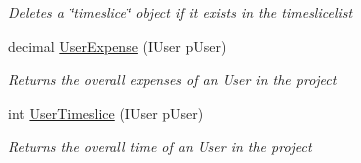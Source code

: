 \begin{DoxyCompactItemize}
\begin{DoxyCompactList}\small\item\em Deletes a \char`\"{}timeslice\char`\"{} object if it exists in the timeslicelist \end{DoxyCompactList}\item 
decimal \hyperlink{class_plex_byte_1_1_mo_cap_1_1_interactions_1_1_account_a44cddcf32dbd3ce31fc012104f25e9f8}{User\+Expense} (I\+User p\+User)
\begin{DoxyCompactList}\small\item\em Returns the overall expenses of an User in the project \end{DoxyCompactList}\item 
int \hyperlink{class_plex_byte_1_1_mo_cap_1_1_interactions_1_1_account_a77706a7728657fb56f5f5dc85bd738f4}{User\+Timeslice} (I\+User p\+User)
\begin{DoxyCompactList}\small\item\em Returns the overall time of an User in the project \end{DoxyCompactList}\end{DoxyCompactItemize}
